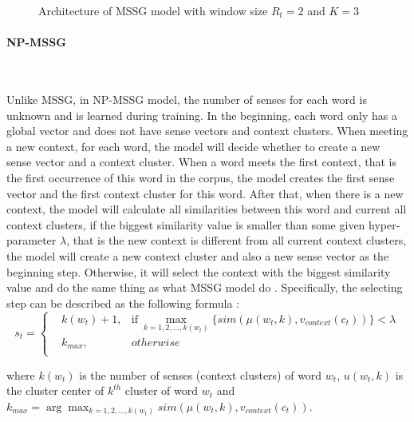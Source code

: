 \begin{figure}[!ht]
  \centering
	\caption{Architecture of MSSG model with window size $R_t=2$ and $K=3$ }
	\label{fig:MSSG}
\end{figure} 

\paragraph{NP-MSSG}\ 

Unlike MSSG, in NP-MSSG model, the number of senses for each word is unknown and is learned during training. In the beginning, each word only has a global vector and does not have sense vectors and context clusters. When meeting a new context, for each word, the model will decide whether to create a new sense vector and a context cluster. When a word meets the first context, that is the first occurrence of this word in the corpus, the model creates the first sense vector and the first context cluster for this word.  After that, when there is a new context, the model will calculate all similarities between this word and current all context clusters, if the biggest similarity value is smaller than some given hyper-parameter $\lambda$, that is the new context is different from all current context clusters, the model will create a new context cluster and also a new sense vector as the beginning step. Otherwise, it will select the context with the biggest similarity value and do the same thing as what MSSG model do . Specifically, the selecting step can be described as the following formula :
$$s_t=\left\{
\begin{aligned}
&k(w_t)+1, &\mathrm{if}\  \max_{k=1,2,\ldots,k(w_t)}\{sim(\mu(w_t,k),v_{context}(c_t))\}<\lambda \\
&k_{max}, & otherwise \\
\end{aligned}
\right.
$$

where $k(w_t)$ is the number of senses (context clusters) of word $w_t$, $u(w_t,k)$ is the cluster center of $k^{th}$ cluster of word $w_t$ and $k_{max}=\arg\max_{k=1,2,…,k(w_t)}sim(\mu(w_t,k),v_{context}(c_t))$. 

